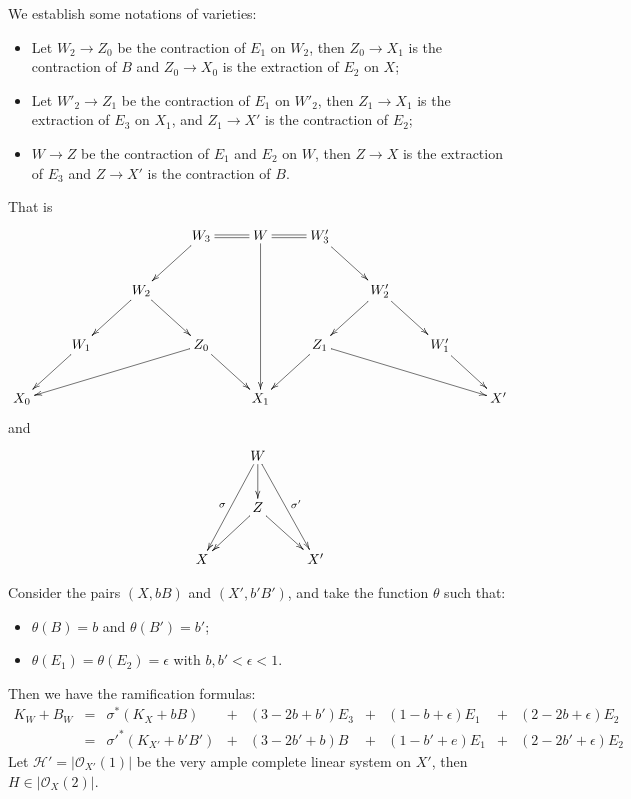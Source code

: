 We establish some notations of varieties:
\begin{itemize}
  \item Let $W_{2}\to Z_{0}$ be the contraction of $E_{1}$ on $W_{2}$, then $Z_{0} \to X_{1}$ is the contraction of $B$  and $Z_{0}\to X_{0}$ is the extraction of $E_{2}$ on $X$;
  \item Let $W'_{2}\to Z_{1}$ be the contraction of $E_{1}$ on $W'_{2}$, then $Z_{1} \to X_{1}$ is the extraction of $E_{3}$ on $X_{1}$, and $Z_{1}\to X'$ is the contraction of $E_{2}$;
  \item $W\to Z$ be the contraction of $E_{1}$ and $E_{2}$ on $W$, then $Z\to X$ is the extraction of $E_{3}$ and $Z\to X'$ is the contraction of $B$.
\end{itemize}
That is
\[ \xymatrix{&&&W_3\ar[ld]\ar@{=}[r]&W\ar[ddd]\ar@{=}[r]&W_3'\ar[rd]\\
    &&W_2\ar[ld]\ar[rd]&&&&W_2'\ar[rd]\ar[dl]\\
    &W_1\ar[ld]&&Z_0\ar[llld]\ar[rd]&&Z_1\ar[ld]\ar[rrrd]&&W_1'\ar[rd]\\
    X_0&&&&X_1&&&&X'
  } \]
and
\[\xymatrix{
    &W\ar[d]\ar[ddl]_{\sigma}\ar[ddr]^{\sigma'}&\\
    &Z\ar[dl]\ar[dr]\\
    X&&X' }  \]

Consider the pairs $ (X,bB) $ and $ (X',b'B') $, and take the function $\theta$ such that:
\begin{itemize}
  \item $\theta(B)=b$ and $\theta(B')=b'$;
  \item $\theta(E_{1})=\theta(E_{2})=\epsilon$ with $b,b'<\epsilon<1$.
\end{itemize}
Then we have the ramification formulas:
\[ \begin{array}{rllllllllll}
    K_W+B_W & = & \sigma^*(K_X+bB)       & + & (3-2b+b')E_3 & + & (1-b+\epsilon)E_1 & + & (2-2b+\epsilon)E_2  & \\
            & = & \sigma'^*(K_{X'}+b'B') & + & (3-2b'+b)B   & + & (1-b'+e)E_1       & + & (2-2b'+\epsilon)E_2 &
  \end{array} \]
Let $ \mathcal{H}'=|\mathcal{O}_{X'}(1)| $ be the very ample complete linear system on $X'$, then $H\in |\mathcal{O}_{X}(2)|$. 


